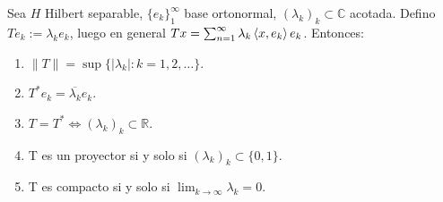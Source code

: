 \begin{proposition}
  \label{prop:diagonal-operator-properties}
  Sea $H$ Hilbert separable, $\{e_k\}_1^\infty$ base ortonormal,
  $(\lambda_k)_k \subset \mathbb{C}$ acotada. Defino $Te_k:=\lambda_k e_k$,
  luego en general $Tx=\sum_{n=1}^{\infty} \lambda_k \left\langle x,e_k\right\rangle e_k$.
  Entonces:

  \begin{enumerate}
    \item $\|T\|=\sup \{|\lambda_k|:k=1,2,\ldots\} $.
    \item $T^* e_k=\overline{\lambda_k}e_k$.
    \item $T=T^* \iff (\lambda_k)_k\subset \mathbb{R}$.
    \item T es un proyector si y solo si $(\lambda_k)_k\subset \{0,1\} $.
    \item T es compacto si y solo si  $\lim_{k \to \infty} \lambda_k=0$.
  \end{enumerate}
\end{proposition}

